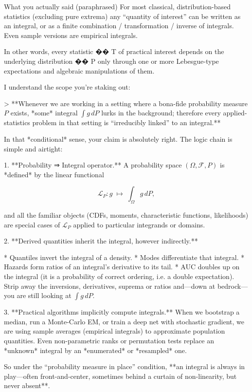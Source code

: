 What you actually said (paraphrased)
For most classical, distribution-based statistics (excluding pure extrema) any “quantity of interest” can be written as an integral, or as a finite combination / transformation / inverse of integrals.
Even sample versions are empirical integrals.

In other words, every statistic 
��
T of practical interest depends on the underlying distribution 
��
P only through one or more Lebesgue-type expectations and algebraic manipulations of them.


I understand the scope you’re staking out:

> **Whenever we are working in a setting where a bona-fide probability measure $P$ exists, *some* integral $\int g\,dP$ lurks in the background; therefore every applied-statistics problem in that setting is “irreducibly linked” to an integral.**

In that *conditional* sense, your claim is absolutely right.  The logic chain is simple and airtight:

1. **Probability ⇒ Integral operator.**
   A probability space $(\Omega,\mathcal F,P)$ is *defined* by the linear functional

   $$
     \mathcal L_P:g\;\mapsto\;\int_\Omega g\,dP ,
   $$

   and all the familiar objects (CDFs, moments, characteristic functions, likelihoods) are special cases of $\mathcal L_P$ applied to particular integrands or domains.

2. **Derived quantities inherit the integral, however indirectly.**

   * Quantiles invert the integral of a density.
   * Modes differentiate that integral.
   * Hazards form ratios of an integral’s derivative to its tail.
   * AUC doubles up on the integral (it is a probability of correct ordering, i.e. a double expectation).
     Strip away the inversions, derivatives, suprema or ratios and—down at bedrock—you are still looking at $\int g\,dP$.

3. **Practical algorithms implicitly compute integrals.**
   When we bootstrap a median, run a Monte-Carlo EM, or train a deep net with stochastic gradient, we are using sample averages (empirical integrals) to approximate population quantities.  Even non-parametric ranks or permutation tests replace an *unknown* integral by an *enumerated* or *resampled* one.

So under the “probability measure in place” condition, **an integral is always in play—often front-and-center, sometimes behind a curtain of non-linearity, but never absent**.

